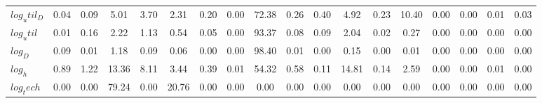 \begin{center}
\begin{longtable}{lccccccccccccccccc}
$log_util_D   $	 & 	            0.04	 & 	            0.09	 & 	            5.01	 & 	            3.70	 & 	            2.31	 & 	            0.20	 & 	            0.00	 & 	           72.38	 & 	            0.26	 & 	            0.40	 & 	            4.92	 & 	            0.23	 & 	           10.40	 & 	            0.00	 & 	            0.00	 & 	            0.01	 & 	            0.03 \\ 
$log_util     $	 & 	            0.01	 & 	            0.16	 & 	            2.22	 & 	            1.13	 & 	            0.54	 & 	            0.05	 & 	            0.00	 & 	           93.37	 & 	            0.08	 & 	            0.09	 & 	            2.04	 & 	            0.02	 & 	            0.27	 & 	            0.00	 & 	            0.00	 & 	            0.00	 & 	            0.00 \\ 
$log_D        $	 & 	            0.09	 & 	            0.01	 & 	            1.18	 & 	            0.09	 & 	            0.06	 & 	            0.00	 & 	            0.00	 & 	           98.40	 & 	            0.01	 & 	            0.00	 & 	            0.15	 & 	            0.00	 & 	            0.01	 & 	            0.00	 & 	            0.00	 & 	            0.00	 & 	            0.00 \\ 
$log_h        $	 & 	            0.89	 & 	            1.22	 & 	           13.36	 & 	            8.11	 & 	            3.44	 & 	            0.39	 & 	            0.01	 & 	           54.32	 & 	            0.58	 & 	            0.11	 & 	           14.81	 & 	            0.14	 & 	            2.59	 & 	            0.00	 & 	            0.00	 & 	            0.01	 & 	            0.00 \\ 
$log_tech     $	 & 	            0.00	 & 	            0.00	 & 	           79.24	 & 	            0.00	 & 	           20.76	 & 	            0.00	 & 	            0.00	 & 	            0.00	 & 	            0.00	 & 	            0.00	 & 	            0.00	 & 	            0.00	 & 	            0.00	 & 	            0.00	 & 	            0.00	 & 	            0.00	 & 	            0.00 \\ 
\end{longtable}
 \end{center}
